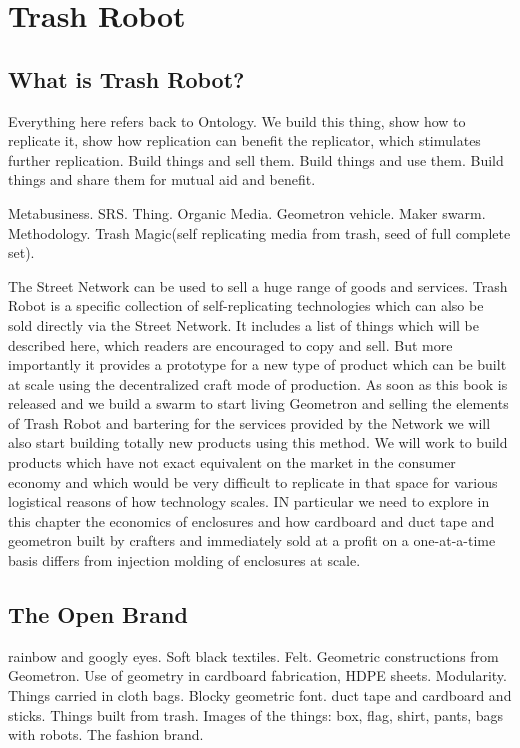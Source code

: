 \section{Trash Robot}

\subsection{What is Trash Robot?}

Everything here refers back to Ontology.  We build this thing, show how to replicate it, show how replication can benefit the replicator, which stimulates further replication.  Build things and sell them. Build things and use them. Build things and share them for mutual aid and benefit. 

Metabusiness.  SRS.  Thing.  Organic Media. Geometron vehicle.  Maker swarm. Methodology.  Trash Magic(self replicating media from trash, seed of full complete set).

The Street Network can be used to sell a huge range of goods and services.  Trash Robot is a specific collection of self-replicating technologies which can also be sold directly via the Street Network.  It includes a list of things which will be described here, which readers are encouraged to copy and sell.  But more importantly it provides a prototype for a new type of product which can be built at scale using the decentralized craft mode of production.  As soon as this book is released and we build a swarm to start living Geometron and selling the elements of Trash Robot and bartering for the services provided by the Network we will also start building totally new products using this method.  We will work to build products which have not exact equivalent on the market in the consumer economy and which would be very difficult to replicate in that space for various logistical reasons of how technology scales.   IN particular we need to explore in this chapter the economics of enclosures and how cardboard and duct tape and geometron built by crafters and immediately sold at a profit on a one-at-a-time basis differs from injection molding of enclosures at scale.  

\subsection{The Open Brand}

rainbow and googly eyes.  Soft black textiles. Felt.  Geometric constructions from Geometron.  Use of geometry in cardboard fabrication, HDPE sheets. Modularity.  Things carried in cloth bags. Blocky geometric font.  duct tape and cardboard and sticks. Things built from trash.  Images of the things: box, flag, shirt, pants, bags with robots.  The fashion brand.  

